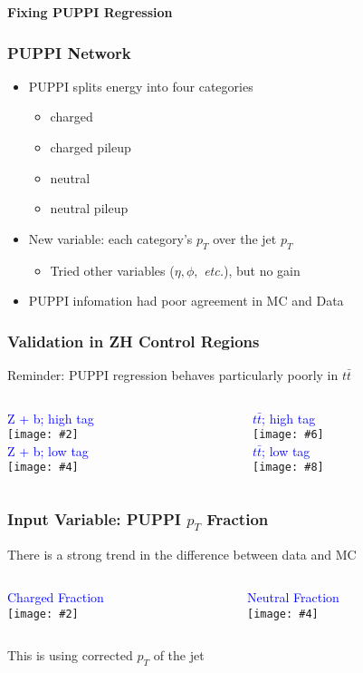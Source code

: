 \documentclass{beamer}
\newcommand{\twofigs}[4]{
  \begin{columns}
    \begin{column}{0.5\linewidth}
      \centering
      \textcolor{blue}{#1} \\
      \texttt{[image: \#2]}
    \end{column}
    \begin{column}{0.5\linewidth}
      \centering
      \textcolor{blue}{#3} \\
      \texttt{[image: \#4]}
    \end{column}
  \end{columns}
}
\newcommand{\fourfigs}[8]{
  \begin{columns}
    \begin{column}{0.3\linewidth}
      \centering
      \textcolor{blue}{#1} \\
      \texttt{[image: \#2]} \\
      \textcolor{blue}{#3} \\
      \texttt{[image: \#4]}
    \end{column}
    \begin{column}{0.3\linewidth}
      \centering
      \textcolor{blue}{#5} \\
      \texttt{[image: \#6]} \\
      \textcolor{blue}{#7} \\
      \texttt{[image: \#8]}
    \end{column}
  \end{columns}
}
\begin{document}
\begin{frame}
  \centering
    {\Huge \bf\sffamily Fixing PUPPI Regression}
\end{frame}


\begin{frame}
  \frametitle{PUPPI Network}

  \begin{itemize}
  \item PUPPI splits energy into four categories
    \begin{itemize}
    \item charged
    \item charged pileup
    \item neutral
    \item neutral pileup
    \end{itemize}
  \item New variable: each category's $p_T$ over the jet $p_T$
    \begin{itemize}
    \item Tried other variables ($\eta, \phi,$ \emph{etc.}), but no gain
    \end{itemize}
  \item PUPPI infomation had poor agreement in MC and Data
  \end{itemize}

\end{frame}


\begin{frame}
  \frametitle{Validation in ZH Control Regions}

  Reminder: PUPPI regression behaves particularly poorly in $t\bar{t}$

  \fourfigs{Z + b; high tag}
           {../../190814/figs/190813_validation/heavyz_jet1_tf_190723_puppi_ptratio.pdf}
           {Z + b; low tag}
           {../../190814/figs/190813_validation/heavyz_jet2_tf_190723_puppi_ptratio.pdf}
           {$t\bar{t}$; high tag}
           {../../190814/figs/190813_validation/tt_jet1_tf_190723_puppi_ptratio.pdf}
           {$t\bar{t}$; low tag}
           {../../190814/figs/190813_validation/tt_jet2_tf_190723_puppi_ptratio.pdf}

\end{frame}


\begin{frame}
  \frametitle{Input Variable: PUPPI $p_T$ Fraction}

  There is a strong trend in the difference between data and MC

  \twofigs{Charged Fraction}
          {../../190911/figs/190815_validation/tt_jet1_puppi_charged_pt_jet1_pt.pdf}
          {Neutral Fraction}
          {../../190911/figs/190815_validation/tt_jet1_puppi_neutral_pt_jet1_pt.pdf}

  This is using corrected $p_T$ of the jet

\end{frame}
\end{document}
